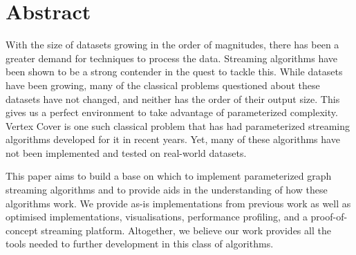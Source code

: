 \section*{Abstract}

With the size of datasets growing in the order of magnitudes, there has been a
greater demand for techniques to process the data. Streaming algorithms have
been shown to be a strong contender in the quest to tackle this. While datasets
have been growing, many of the classical problems questioned about these
datasets have not changed, and neither has the order of their output size. This
gives us a perfect environment to take advantage of parameterized complexity.
Vertex Cover is one such classical problem that has had parameterized streaming
algorithms developed for it in recent years. Yet, many of these algorithms have
not been implemented and tested on real-world datasets.

This paper aims to build a base on which to implement parameterized graph
streaming algorithms and to provide aids in the understanding of how these
algorithms work. We provide as-is implementations from previous work as well as
optimised implementations, visualisations, performance profiling, and a
proof-of-concept streaming platform. Altogether, we believe our work provides
all the tools needed to further development in this class of algorithms.

\pagebreak
